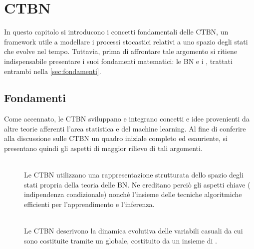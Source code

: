 
\chapter{\texorpdfstring{CTBN}{\ctbn{}}}
\label{cap:ctbn}
\acresetall
In questo capitolo si introducono i concetti fondamentali delle \ac{CTBN}, un framework utile a modellare i processi stocastici relativi a uno spazio degli stati che evolve nel tempo.
Tuttavia, prima di affrontare tale argomento si ritiene indispensabile presentare i suoi fondamenti matematici: le \ac{BN} e i \mprocess{}, trattati entrambi nella \autoref{sec:fondamenti}.

\section{Fondamenti}
\label{sec:fondamenti}
Come accennato, le \acl{CTBN} sviluppano e integrano concetti e idee provenienti da altre teorie afferenti l'area statistica e del machine learning. Al fine di conferire alla discussione sulle \acs{CTBN} un quadro iniziale completo ed esauriente, si presentano quindi gli aspetti di maggior rilievo di tali argomenti.
\begin{description}
\item[\bn{}] \hfill \\
Le \acl{CTBN} utilizzano una rappresentazione strutturata dello spazio degli stati propria della teoria delle \acl{BN}. Ne ereditano perciò gli aspetti chiave (\eg{} indipendenza condizionale) nonché l'insieme delle tecniche algoritmiche efficienti per l'apprendimento e l'inferenza.
\item[\mprocess{}] \hfill \\
\label{sec:fondamenti-mp}
Le \acl{CTBN} descrivono la dinamica evolutiva delle variabili casuali da cui sono costituite tramite un \homm\mprocess globale, costituito da un insieme di \conm\mprocess{}.
\end{description} 

